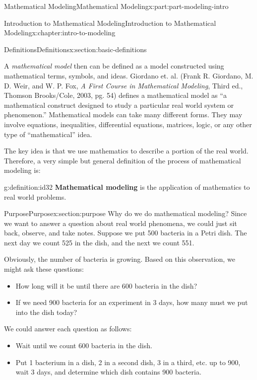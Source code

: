 \documentclass[oneside,10pt,]{book}
\newcommand{\terminology}[1]{\textbf{#1}}
\numberwithin{equation}{section}
\begin{document}
\begin{partptx}{Mathematical Modeling}{}{Mathematical Modeling}{}{}{x:part:part-modeling-intro}
\begin{chapterptx}{Introduction to Mathematical Modeling}{}{Introduction to Mathematical Modeling}{}{}{x:chapter:intro-to-modeling}
\begin{sectionptx}{Definitions}{}{Definitions}{}{}{x:section:basic-definitions}
\par
A \emph{mathematical model} then can be defined as a model constructed using mathematical terms, symbols, and ideas. Giordano et. al. (Frank R. Giordano, M. D. Weir, and W. P. Fox, \emph{A First Course in Mathematical Modeling}, Third ed., Thomson Brooks\slash{}Cole, 2003, pg. 54) defines a mathematical model as “a mathematical construct designed to study a particular real world system or phenomenon.” Mathematical models can take many different forms. They may involve equations, inequalities, differential equations, matrices, logic, or any other type of “mathematical” idea.%
\par
The key idea is that we use mathematics to describe a portion of the real world. Therefore, a very simple but general definition of the process of mathematical modeling is:%
\begin{definition}{}{g:definition:id32}%
\terminology{Mathematical modeling} is the application of mathematics to real world problems.%
\end{definition}
\end{sectionptx}
%
%
\typeout{************************************************}
\typeout{************************************************}
%
\begin{sectionptx}{Purpose}{}{Purpose}{}{}{x:section:purpose}
Why do we do mathematical modeling? Since we want to answer a question about real world phenomena, we could just sit back, observe, and take notes. Suppose we put 500 bacteria in a Petri dish. The next day we count 525 in the dish, and the next we count 551.%
\par
Obviously, the number of bacteria is growing. Based on this observation, we might ask these questions:%
%
\begin{itemize}[label=\textbullet]
\item{}How long will it be until there are 600 bacteria in the dish?%
\item{}If we need 900 bacteria for an experiment in 3 days, how many must we put into the dish today?%
\end{itemize}
We could answer each question as follows:%
%
\begin{itemize}[label=\textbullet]
\item{}Wait until we count 600 bacteria in the dish.%
\item{}Put 1 bacterium in a dish, 2 in a second dish, 3 in a third, etc. up to 900, wait 3 days, and determine which dish contains 900 bacteria.%
\end{itemize}

\end{sectionptx}
\end{chapterptx}
\end{partptx}
\end{document}
